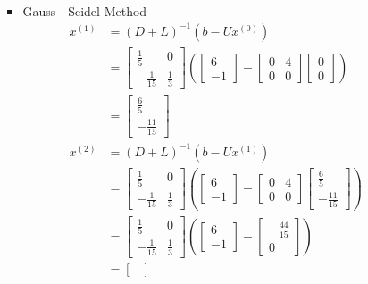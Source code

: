 \documentclass{article}
\begin{document}
\begin{enumerate}
\begin{enumerate}
\begin{itemize}
\begin{align*}
\end{align*}
\item 
Gauss - Seidel Method
\begin{align*}
x^{(1)} &= (D+L)^{-1}(b - Ux^{(0)})\\
&=\begin{bmatrix}
\frac{1}{5} &0 \\ -\frac{1}{15} &\frac{1}{3}
\end{bmatrix}\left(\begin{bmatrix}
6\\-1
\end{bmatrix}-\begin{bmatrix}
0&4\\0&0
\end{bmatrix}\begin{bmatrix}
0\\0
\end{bmatrix}\right)\\
&=\begin{bmatrix}
\frac{6}{5}\\-\frac{11}{15}
\end{bmatrix}\\
x^{(2)} &= (D+L)^{-1}(b - Ux^{(1)})\\
&=\begin{bmatrix}
\frac{1}{5} &0 \\ -\frac{1}{15} &\frac{1}{3}
\end{bmatrix}\left(\begin{bmatrix}
6\\-1
\end{bmatrix}-\begin{bmatrix}
0&4\\0&0
\end{bmatrix}\begin{bmatrix}
\frac{6}{5}\\-\frac{11}{15}
\end{bmatrix}\right)\\
&=\begin{bmatrix}
\frac{1}{5} &0 \\ -\frac{1}{15} &\frac{1}{3}
\end{bmatrix}\left(\begin{bmatrix}
6\\-1
\end{bmatrix}-\begin{bmatrix}
-\frac{44}{15}\\0
\end{bmatrix}\right)\\
&=\begin{bmatrix}

\end{bmatrix}
\end{align*}
\end{itemize}
\end{enumerate}
\end{enumerate}
\end{document}
